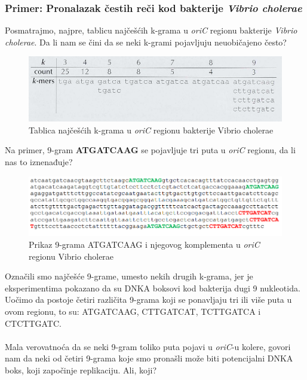 \subsubsection{Primer: Pronalazak čestih reči kod bakterije \textit{Vibrio cholerae}} 

Posmatrajmo, najpre, tablicu najčešćih k-grama u \textit{oriC} regionu bakterije \textit{Vibrio cholerae}. Da li nam se čini da se neki k-grami pojavljuju neuobičajeno često?\\ 

\begin{figure}[h]
\caption{Tablica najčešćih k-grama u \textit{oriC} regionu bakterije Vibrio cholerae}
\centering
\includegraphics[width=1\textwidth]{poglavlja/1/slike/Tablica_VC.png}
\end{figure} 

Na primer, 9-gram \textbf{ATGATCAAG} se pojavljuje tri puta u \textit{oriC} regionu, da li nas to iznenađuje?\\

\begin{figure}[h]
\caption{Prikaz 9-grama ATGATCAAG i njegovog komplementa u \textit{oriC} regionu Vibrio cholerae}
\centering
\includegraphics[width=1\textwidth]{poglavlja/1/slike/9_VC.png}
\end{figure} 

Označili smo najčešće 9-grame, umesto nekih drugih k-grama, jer je eksperimentima pokazano da su DNKA boksovi kod bakterija dugi 9 nukleotida. Uočimo da postoje četiri različita 9-grama koji se ponavljaju tri ili više puta u ovom regionu, to su: ATGATCAAG, CTTGATCAT, TCTTGATCA i CTCTTGATC.\\\\

Mala verovatnoća da se neki 9-gram toliko puta pojavi u \textit{oriC}-u kolere, govori nam da neki od četiri 9-grama koje smo pronašli može biti potencijalni DNKA boks, koji započinje replikaciju. Ali, koji?\\\\

